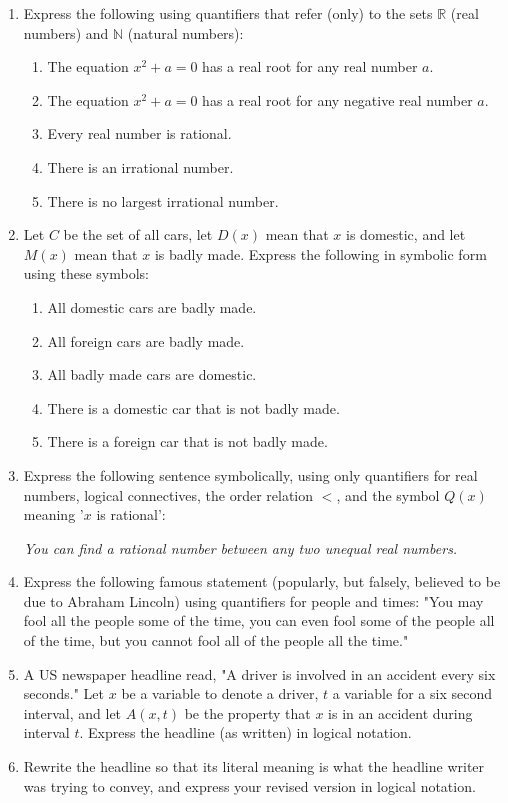 \documentclass[13.5pt]{article}
\begin{document}
\begin{enumerate}
\item{Express the following using quantifiers that refer (only) to the sets \(\mathbb{R}\) (real numbers) and \(\mathbb{N}\) (natural numbers):}

\begin{enumerate}
\setlength{\itemindent}{.1in}
\item{The equation \(x^2+a=0\) has a real root for any real number \(a\).}\
\item{The equation \(x^2+a=0\) has a real root for any negative real number \(a\).}\
\item{Every real number is rational.}\
\item{There is an irrational number.}\
\item{There is no largest irrational number.}\
\end{enumerate}

\item{Let \(C\) be the set of all cars, let \(D(x)\) mean that \(x\) is domestic, and let \(M(x)\) mean that \(x\) is badly made. Express the following in symbolic form using these symbols:}

\begin{enumerate}
\setlength{\itemindent}{.1in}
\item{All domestic cars are badly made.}\
\item{All foreign cars are badly made.}\
\item{All badly made cars are domestic.}\
\item{There is a domestic car that is not badly made.}\
\item{There is a foreign car that is not badly made.}\
\end{enumerate}

\item{Express the following sentence symbolically, using only quantifiers for real numbers, logical connectives, the order relation \(<\), and the symbol \(Q(x)\) meaning '\(x\) is rational': }
\begin{center}
\textit{You can find a rational number between any two unequal real numbers.}
\end{center}

\item{Express the following famous statement (popularly, but falsely, believed to be due to Abraham Lincoln) using quantifiers for people and times: "You may fool all the people some of the time, you can even fool some of the people all of the time, but you cannot fool all of the people all the time." }

\item{ A US newspaper headline read, "A driver is involved in an accident every six seconds." Let \(x\) be a variable to denote a driver, \(t\) a variable for a six second interval, and let \(A(x,t)\) be the property that \(x\) is in an accident during interval \(t\). Express the headline (as written) in logical notation. }

\item{Rewrite the headline so that its literal meaning is what the headline writer was trying to convey, and express your revised version in logical notation.}

\end{enumerate}
\end{document}
